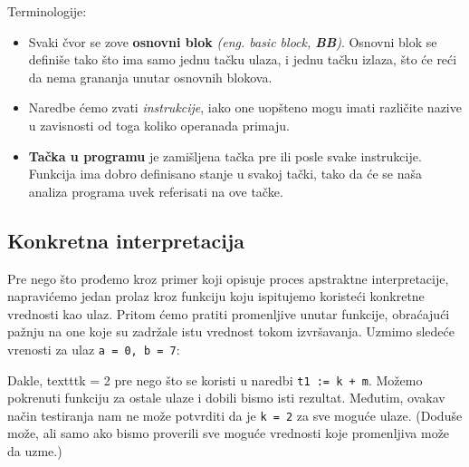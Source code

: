Terminologije:
\begin{itemize}
\item Svaki čvor se zove \textbf{osnovni blok} \emph{(eng. basic block, \textbf{BB})}.
Osnovni blok se definiše tako što ima samo jednu tačku ulaza, i jednu tačku izlaza,
što će reći da nema grananja unutar osnovnih blokova.
\item Naredbe ćemo zvati \emph{instrukcije}, iako one uopšteno mogu imati
različite nazive u zavisnosti od toga koliko operanada primaju.
\item \textbf{Tačka u programu} je zamišljena tačka pre ili posle svake instrukcije.
Funkcija ima dobro definisano stanje u svakoj tački, tako da će se naša analiza
programa uvek referisati na ove tačke.
\end{itemize}


\subsection{Konkretna interpretacija}
\label{subsec:concreteimpr}
Pre nego što prođemo kroz primer koji opisuje proces apstraktne interpretacije,
napravićemo jedan prolaz kroz funkciju koju ispitujemo koristeći konkretne vrednosti
kao ulaz. Pritom ćemo pratiti promenljive unutar funkcije, obraćajući pažnju na
one koje su zadržale istu vrednost tokom izvršavanja. Uzmimo sledeće vrenosti za ulaz
\texttt{a = 0, b = 7}:
 
Dakle, texttt{k = 2} pre nego što se koristi u naredbi \texttt{t1 := k + m}.
Možemo pokrenuti funkciju za ostale ulaze i dobili bismo isti rezultat.
Međutim, ovakav način testiranja nam ne može potvrditi da je \texttt{k = 2} za
sve moguće ulaze. (Doduše može, ali samo ako bismo proverili sve moguće vrednosti
koje promenljiva može da uzme.)


